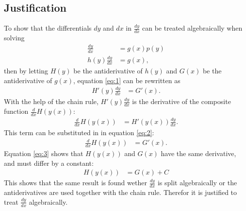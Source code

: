 \subsection{Justification} 
To show that the differentials $dy$ and $dx$ in $\frac{dy}{dx}$ can be treated algebraically when solving 
 \begin{align}
	\frac{dy}{dx} &= g(x)p(y)\nonumber\\
	h(y)\frac{dy}{dx} &= g(x)\label{eq:1},
 \end{align}
then by letting $H(y)$ be the antiderivative of $h(y)$ and $G(x)$ be the antiderivative of $g(x)$, equation \ref{eq:1} can be rewritten as 
 \begin{align}
 	H'(y)\frac{dy}{dx} &= G'(x)\label{eq:2}.
 \end{align}
With the help of the chain rule, $H'(y)\frac{dy}{dx}$ is the derivative of the composite function $\frac{d}{dx}H(y(x))$:
 \begin{align*}
	\frac{d}{dx} H(y(x)) &= H'(y(x))\frac{dy}{dx}.
 \end{align*}
This term can be substituted in in equation \ref{eq:2}:
 \begin{align}
 	\frac{d}{dx}H(y(x)) &= G'(x)\label{eq:3}.
 \end{align}
Equation \ref{eq:3} shows that $H(y(x))$ and $G(x)$ have the same derivative, and must differ by a constant:
 \begin{align*}
 	H(y(x)) &= G(x) + C
 \end{align*}
This shows that the same result is found wether $\frac{dy}{dx}$ is split algebraically or the antiderivatives are used together with the chain rule. Therefor it is justified to treat $\frac{dy}{dx}$ algebraically.\\

